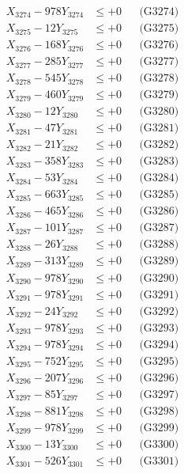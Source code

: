 \documentclass[a4paper,10pt]{article}
\begin{document}
{\begin{align}
X_{3274} - 978Y_{3274} &\leq +0 && \text{(G3274)} \\
X_{3275} - 12Y_{3275} &\leq +0 && \text{(G3275)} \\
X_{3276} - 168Y_{3276} &\leq +0 && \text{(G3276)} \\
X_{3277} - 285Y_{3277} &\leq +0 && \text{(G3277)} \\
X_{3278} - 545Y_{3278} &\leq +0 && \text{(G3278)} \\
X_{3279} - 460Y_{3279} &\leq +0 && \text{(G3279)} \\
X_{3280} - 12Y_{3280} &\leq +0 && \text{(G3280)} \\
\allowbreak
X_{3281} - 47Y_{3281} &\leq +0 && \text{(G3281)} \\
X_{3282} - 21Y_{3282} &\leq +0 && \text{(G3282)} \\
X_{3283} - 358Y_{3283} &\leq +0 && \text{(G3283)} \\
X_{3284} - 53Y_{3284} &\leq +0 && \text{(G3284)} \\
X_{3285} - 663Y_{3285} &\leq +0 && \text{(G3285)} \\
X_{3286} - 465Y_{3286} &\leq +0 && \text{(G3286)} \\
X_{3287} - 101Y_{3287} &\leq +0 && \text{(G3287)} \\
X_{3288} - 26Y_{3288} &\leq +0 && \text{(G3288)} \\
X_{3289} - 313Y_{3289} &\leq +0 && \text{(G3289)} \\
X_{3290} - 978Y_{3290} &\leq +0 && \text{(G3290)} \\
\allowbreak
X_{3291} - 978Y_{3291} &\leq +0 && \text{(G3291)} \\
X_{3292} - 24Y_{3292} &\leq +0 && \text{(G3292)} \\
X_{3293} - 978Y_{3293} &\leq +0 && \text{(G3293)} \\
X_{3294} - 978Y_{3294} &\leq +0 && \text{(G3294)} \\
X_{3295} - 752Y_{3295} &\leq +0 && \text{(G3295)} \\
X_{3296} - 207Y_{3296} &\leq +0 && \text{(G3296)} \\
X_{3297} - 85Y_{3297} &\leq +0 && \text{(G3297)} \\
X_{3298} - 881Y_{3298} &\leq +0 && \text{(G3298)} \\
X_{3299} - 978Y_{3299} &\leq +0 && \text{(G3299)} \\
X_{3300} - 13Y_{3300} &\leq +0 && \text{(G3300)} \\
\allowbreak
X_{3301} - 526Y_{3301} &\leq +0 && \text{(G3301)} \\

\end{align}}
\end{document}
